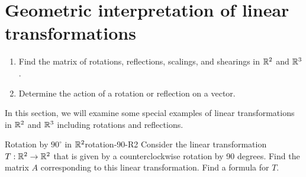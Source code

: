 \section{Geometric interpretation of linear transformations}

\begin{outcome}
  \begin{enumerate}
  \item Find the matrix of rotations, reflections, scalings, and
    shearings in $\mathbb{R}^2$ and $\mathbb{R}^3$.
  \item Determine the action of a rotation or reflection on a vector.
  \end{enumerate}
\end{outcome}

In this section, we will examine some special examples of linear
transformations in $\mathbb{R}^2$ and $\mathbb{R}^3$ including rotations and
reflections.

\begin{example}{Rotation by $90^{\circ}$ in $\mathbb{R}^2$}{rotation-90-R2}
  Consider the linear transformation $T:\mathbb{R}^2\to\mathbb{R}^2$ that is given by
  a counterclockwise rotation by 90 degrees. Find the matrix%
   $A$ corresponding to this linear
  transformation. Find a formula for $T$.
\end{example}

